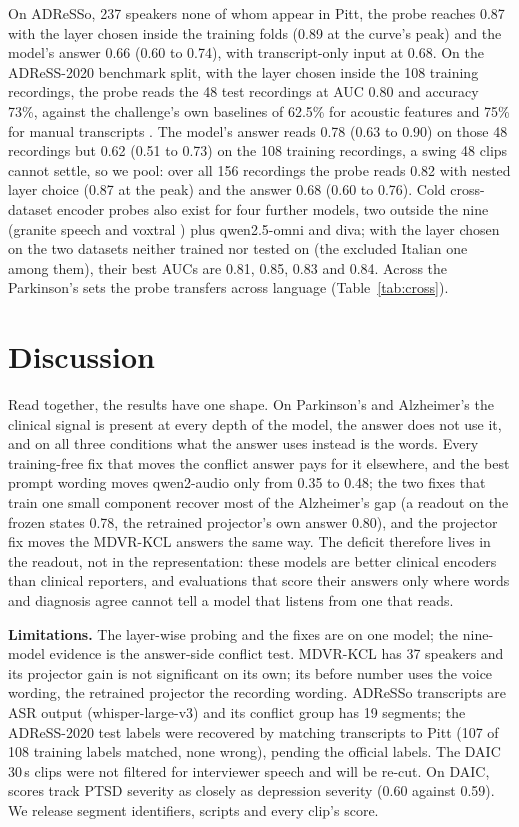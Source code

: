 \documentclass[conference]{IEEEtran}
\begin{document}
On ADReSSo, 237 speakers none of whom appear in Pitt, the probe reaches 0.87 with the layer chosen
inside the training folds (0.89 at the curve's peak) and the model's answer 0.66 (0.60 to 0.74), with
transcript-only input at 0.68. On the ADReSS-2020 benchmark split, with the layer chosen inside the
108 training recordings, the probe reads the 48 test recordings at AUC 0.80 and accuracy 73\%,
against the challenge's own baselines of 62.5\% for acoustic features and 75\% for manual transcripts
\cite{adress2020}. The model's answer reads 0.78 (0.63 to 0.90) on those 48 recordings but 0.62 (0.51
to 0.73) on the 108 training recordings, a swing 48 clips cannot settle, so we pool: over all 156
recordings the probe reads 0.82 with nested layer choice (0.87 at the peak) and the answer 0.68 (0.60
to 0.76). Cold cross-dataset encoder probes also exist for four further models, two outside the nine (granite
speech \cite{granite} and voxtral \cite{voxtral}) plus qwen2.5-omni and diva; with the layer chosen
on the two datasets neither trained nor tested on (the excluded Italian one among them), their best
AUCs are 0.81, 0.85, 0.83 and 0.84. Across the Parkinson's sets the probe transfers
across language (Table~\ref{tab:cross}).

\section{Discussion}\label{sec:discussion}

Read together, the results have one shape. On Parkinson's and Alzheimer's the clinical signal is
present at every depth of the model, the answer does not use it, and on all three conditions what the
answer uses instead is the words. Every training-free fix that moves the conflict answer pays for it
elsewhere, and the best prompt wording moves qwen2-audio only from 0.35 to 0.48; the two fixes that
train one small component recover most of the Alzheimer's gap (a readout on the frozen states 0.78,
the retrained projector's own answer 0.80), and the projector fix moves the MDVR-KCL answers the same
way. The deficit therefore lives
in the readout, not in the representation:
these models are better clinical encoders than clinical reporters, and evaluations that score
their answers only where words and diagnosis agree cannot tell a model that listens from one that
reads.

\noindent\textbf{Limitations.} The layer-wise probing and the fixes are on one model; the nine-model
evidence is the answer-side conflict test. MDVR-KCL has 37 speakers and its projector gain is
not significant on its own; its before number uses the voice wording, the retrained projector the
recording wording. ADReSSo transcripts are ASR output (whisper-large-v3) and its conflict
group has 19 segments; the ADReSS-2020 test labels were recovered by matching transcripts to Pitt
(107 of 108 training labels matched, none wrong), pending the official labels. The DAIC 30\,s clips were not filtered for
interviewer speech and will be re-cut. On DAIC, scores track PTSD severity
as closely as depression severity (0.60 against 0.59). We release segment identifiers, scripts and every clip's score.
\end{document}
